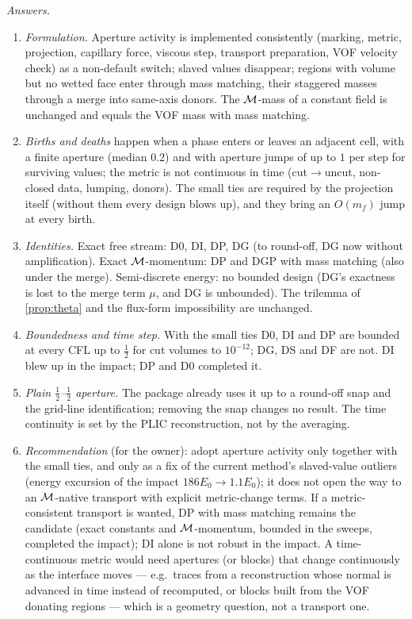 \emph{Answers.}
\begin{enumerate}[leftmargin=*,itemsep=2pt]
\item \emph{Formulation.}  Aperture activity is implemented consistently (marking, metric,
  projection, capillary force, viscous step, transport preparation, VOF velocity check) as a
  non-default switch; slaved values disappear; regions with volume but no wetted face enter
  through mass matching, their staggered masses through a merge into same-axis donors.  The
  $\mathcal M$-mass of a constant field is unchanged and equals the VOF mass with mass matching.
\item \emph{Births and deaths} happen when a phase enters or leaves an adjacent cell, with a
  finite aperture (median $0.2$) and with aperture jumps of up to $1$ per step for surviving
  values; the metric is not continuous in time (cut$\to$uncut, non-closed data, lumping, donors).
  The small ties are required by the projection itself (without them every design blows up),
  and they bring an $O(m_f)$ jump at every birth.
\item \emph{Identities.}  Exact free stream: D0, DI, DP, DG (to round-off, DG now without
  amplification).  Exact $\mathcal M$-momentum: DP and DGP with mass matching (also under the merge).
  Semi-discrete energy: no bounded design (DG's exactness is lost to the merge term $\mu$, and DG
  is unbounded).  The trilemma of \cref{prop:theta} and the flux-form impossibility are unchanged.
\item \emph{Boundedness and time step.}  With the small ties D0, DI and DP are bounded at every
  CFL up to $\tfrac12$ for cut volumes to $10^{-12}$; DG, DS and DF are not.  DI blew up in the
  impact; DP and D0 completed it.
\item \emph{Plain $\tfrac12$--$\tfrac12$ aperture.}  The package already uses it up to a round-off
  snap and the grid-line identification; removing the snap changes no result.  The time
  continuity is set by the PLIC reconstruction, not by the averaging.
\item \emph{Recommendation} (for the owner): adopt aperture activity only together with the
  small ties, and only as a fix of the current method's slaved-value outliers (energy excursion
  of the impact $186E_0\to1.1E_0$); it does not open the way to an $\mathcal M$-native transport with
  explicit metric-change terms.  If a metric-consistent transport is wanted, DP with mass
  matching remains the candidate (exact constants and $\mathcal M$-momentum, bounded in the sweeps,
  completed the impact); DI alone is not robust in the impact.  A time-continuous metric would
  need apertures (or blocks) that change continuously as the interface moves --- e.g.\ traces
  from a reconstruction whose normal is advanced in time instead of recomputed, or blocks built
  from the VOF donating regions --- which is a geometry question, not a transport one.
\end{enumerate}
